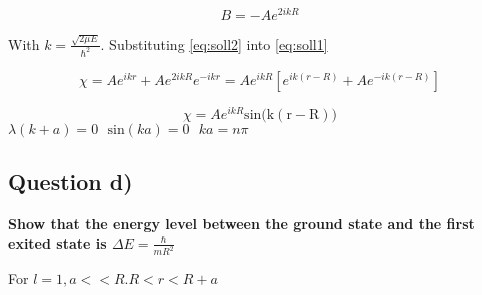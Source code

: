 \documentclass[12pt]{article}
\begin{document}
\begin{equation}
\label{eq:soll2}
B=-Ae^{2ikR}
\end{equation}

\noindent
With $k=\frac{\sqrt{2\mu E}}{\hbar^{2}}$. Substituting \cref{eq:soll2} into \cref{eq:soll1}

\begin{equation}
\label{eq:soll3}
\chi=Ae^{ikr}+Ae^{2ikR}e^{-ikr}=Ae^{ikR}\left[  e^{ik(r-R)}+Ae^{-ik(r-R)} \right]
\end{equation}

\begin{equation}
\label{eq:soll4}
\chi=Ae^{ikR}\mathrm{sin({k(r-R))}}
\end{equation}
$\lambda(k+a)=0\text{ }\mathrm{sin}(ka)=0\text{ }ka=n\pi$

\subsection*{Question d)}
\noindent
\textbf{Show that the energy level between the ground state and the first exited state is $\Delta E=\frac{\hbar}{mR^{2}}$}

For $l=1,a<<R.R<r<R+a$

 
\end{document}

